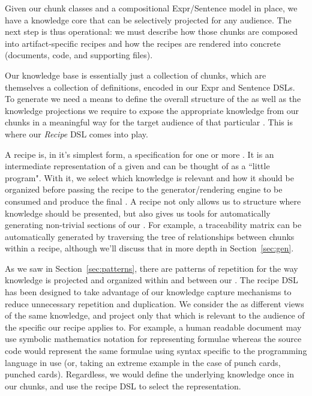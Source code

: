 Given our chunk classes and a compositional Expr/Sentence model in place, we 
have a knowledge core that can be selectively projected for any audience. The 
next step is thus operational: we must describe how those chunks are composed 
into artifact-specific recipes and how the recipes are rendered into concrete 
\sfs{} (documents, code, and supporting files).

Our knowledge base is essentially just a collection of chunks, which are 
themselves a collection of definitions, encoded in our Expr and Sentence DSLs. 
To generate \sfs{} we need a means to define the overall structure of the \sf{} 
as well as the knowledge projections we require to expose the appropriate 
knowledge from our chunks in a meaningful way for the target audience of that 
particular \sf{}. This is where our \emph{Recipe} DSL comes into play.

A recipe is, in it's simplest form, a specification for one or more \sfs{}. 
It is an intermediate representation of a given \sf{} and can be thought of as 
a ``little program". With it, we select which knowledge is relevant and how it 
should be organized before passing the recipe to the generator/rendering engine 
to be consumed and produce the final \sf{}. A recipe not only allows us to 
structure where knowledge should be presented, but also gives us tools for 
automatically generating non-trivial sections of our \sfs{}. For example, a 
traceability matrix can be automatically generated by traversing the tree of 
relationships between chunks within a recipe, although we'll discuss that in 
more depth in Section~\ref{sec:gen}.

As we saw in Section~\ref{sec:patterns}, there are patterns of repetition for 
the way knowledge is projected and organized within and between our \sfs{}. The 
recipe DSL has been designed to take advantage of our knowledge capture 
mechanisms to reduce unnecessary repetition and duplication. We consider the 
\sfs{} as different views of the same knowledge, and project only that which is 
relevant to the audience of the specific \sf{} our recipe applies to. For 
example, a human readable document may use symbolic mathematics notation for 
representing formulae whereas the source code would represent the same formulae 
using syntax specific to the programming language in use (or, taking an extreme 
example in the case of punch cards, punched cards). Regardless, we would define 
the underlying knowledge once in our chunks, and use the recipe DSL to select 
the representation.

